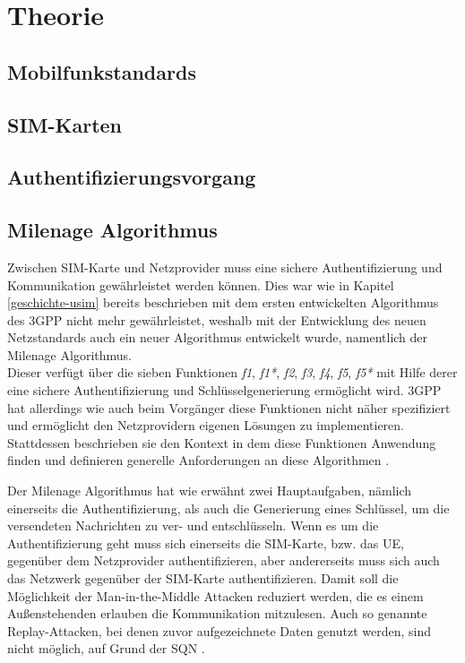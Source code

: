 \clearpage

\section{Theorie}
\label{theorie}

\subsection{Mobilfunkstandards}

\subsection{SIM-Karten}

\subsection{Authentifizierungsvorgang}
\label{authentifizierungsvorgang}

\subsection{Milenage Algorithmus}
\label{milenage}
Zwischen \ac{SIM}-Karte und Netzprovider muss eine sichere Authentifizierung und Kommunikation gewährleistet werden können. Dies war wie in Kapitel \ref{geschichte-usim} bereits beschrieben mit dem ersten entwickelten Algorithmus des \ac{3GPP} nicht mehr gewährleistet, weshalb mit der Entwicklung des neuen Netzstandards auch ein neuer Algorithmus entwickelt wurde, namentlich der Milenage Algorithmus. \\
Dieser verfügt über die sieben Funktionen \emph{f1}, \emph{f1*}, \emph{f2}, \emph{f3}, \emph{f4}, \emph{f5}, \emph{f5*} mit Hilfe derer eine sichere Authentifizierung und Schlüsselgenerierung ermöglicht wird. 3GPP hat allerdings wie auch beim Vorgänger diese Funktionen nicht näher spezifiziert und ermöglicht den Netzprovidern eigenen Lösungen zu implementieren. Stattdessen beschrieben sie den Kontext in dem diese Funktionen Anwendung finden und definieren generelle Anforderungen an diese Algorithmen \cite{3gpp.35.205}.

Der Milenage Algorithmus hat wie erwähnt zwei Hauptaufgaben, nämlich einerseits die Authentifizierung, als auch die Generierung eines Schlüssel, um die versendeten Nachrichten zu ver- und entschlüsseln. Wenn es um die Authentifizierung geht muss sich einerseits die SIM-Karte, bzw. das \ac{UE}, gegenüber dem Netzprovider authentifizieren, aber andererseits muss sich auch das Netzwerk gegenüber der SIM-Karte authentifizieren. Damit soll die Möglichkeit der Man-in-the-Middle Attacken reduziert werden, die es einem Außenstehenden erlauben die Kommunikation mitzulesen. Auch so genannte Replay-Attacken, bei denen zuvor aufgezeichnete Daten genutzt werden, sind nicht möglich, auf Grund der \acl{SQN} \cite{spitz11}.

